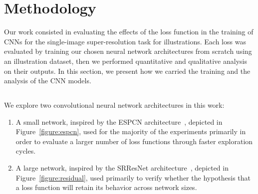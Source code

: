 \section{Methodology}

Our work consisted in evaluating the effects of the loss function in the training of CNNs for the single-image super-resolution task for illustrations.
Each loss was evaluated by training our chosen neural network architectures from scratch using an illustration dataset, then we performed quantitative and qualitative analysis on their outputs.
In this section, we present how we carried the training and the analysis of the CNN models.





\subsection{}
\label{section:methodology/architectures}

We explore two convolutional neural network architectures in this work:

\begin{enumerate}
  \item A small network, inspired by the ESPCN architecture~\cite{shi2016realtime}, depicted in Figure~\ref{figure:espcn}, used for the majority of the experiments primarily in order to evaluate a larger number of loss functions through faster exploration cycles.
  \item A large network, inspired by the SRResNet architecture~\cite{ledig2017photorealistic}, depicted in Figure~\ref{figure:residual}, used primarily to verify whether the hypothesis that a loss function will retain its behavior across network sizes.
\end{enumerate}


